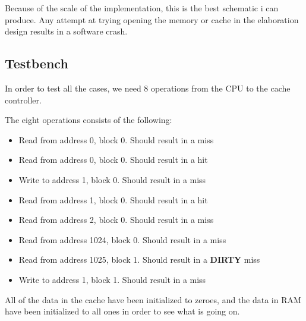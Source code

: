 \documentclass{article}
\begin{document}
Because of the scale of the implementation, this is the best schematic i can produce. Any attempt at trying opening the memory or cache in the elaboration design results in a software crash. 

\subsection{Testbench}

In order to test all the cases, we need 8 operations from the CPU to the cache controller.

The eight operations consists of the following:
\begin{itemize}
  \item{Read from address 0, block 0. Should result in a miss}
  \item{Read from address 0, block 0. Should result in a hit}
  \item{Write to address 1, block 0. Should result in a miss}
  \item{Read from address 1, block 0. Should result in a hit}
  \item{Read from address 2, block 0. Should result in a miss}
  \item{Read from address 1024, block 0. Should result in a miss}
  \item{Read from address 1025, block 1. Should result in a \textbf{DIRTY} miss}
  \item{Write to address 1, block 1. Should result in a miss}
\end{itemize}

All of the data in the cache have been initialized to zeroes, and the data in RAM have been initialized to all ones in order to see what is going on. 
\end{document}
